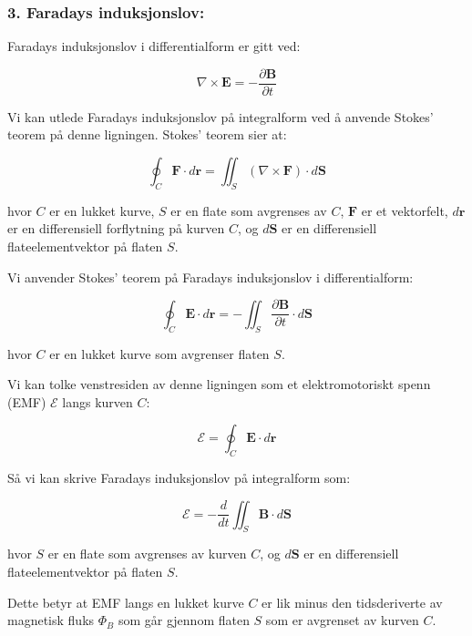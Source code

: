 \subsubsection*{3. Faradays induksjonslov:}
Faradays induksjonslov i differentialform er gitt ved:

\begin{equation*}
    \nabla \times \mathbf{E}=-\frac{\partial \mathbf{B}}{\partial t}
\end{equation*}

Vi kan utlede Faradays induksjonslov på integralform ved å anvende Stokes' teorem på denne ligningen. Stokes' teorem sier at:

\begin{equation*}
    \oint_{C} \mathbf{F} \cdot d \mathbf{r}=\iint_{S}(\nabla \times \mathbf{F}) \cdot d \mathbf{S}
\end{equation*}

hvor $C$ er en lukket kurve, $S$ er en flate som avgrenses av $C$, $\mathbf{F}$ er et vektorfelt, $d\mathbf{r}$ er en differensiell forflytning på kurven $C$, og $d\mathbf{S}$ er en differensiell flateelementvektor på flaten $S$.

Vi anvender Stokes' teorem på Faradays induksjonslov i differentialform:

\begin{equation*}
    \oint_{C} \mathbf{E} \cdot d \mathbf{r}=-\iint_{S} \frac{\partial \mathbf{B}}{\partial t} \cdot d \mathbf{S}
\end{equation*}

hvor $C$ er en lukket kurve som avgrenser flaten $S$.

Vi kan tolke venstresiden av denne ligningen som et elektromotoriskt spenn (EMF) $\mathcal{E}$ langs kurven $C$:

\begin{equation*}
    \mathcal{E}=\oint_{C} \mathbf{E} \cdot d \mathbf{r}
\end{equation*}

Så vi kan skrive Faradays induksjonslov på integralform som:

\begin{equation*}
    \mathcal{E}=-\frac{d}{d t} \iint_{S} \mathbf{B} \cdot d \mathbf{S}
\end{equation*}

hvor $S$ er en flate som avgrenses av kurven $C$, og $d\mathbf{S}$ er en differensiell flateelementvektor på flaten $S$.

Dette betyr at EMF langs en lukket kurve $C$ er lik minus den tidsderiverte av magnetisk fluks $\Phi_B$ som går gjennom flaten $S$ som er avgrenset av kurven $C$.

